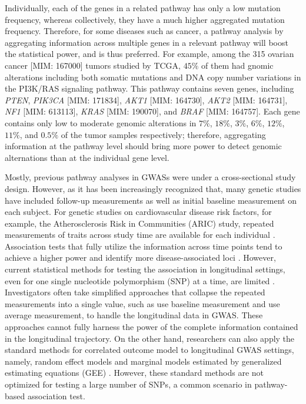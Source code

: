 \documentclass[12pt]{article}
\begin{document}
Individually, each of the genes in a related pathway has only a low mutation frequency, whereas collectively, they have a much higher aggregated mutation frequency. Therefore, for some diseases such as cancer, a pathway analysis by aggregating information across multiple genes in a relevant pathway will boost the statistical power, and is thus preferred. For example, among the 315 ovarian cancer [MIM: 167000] tumors studied by TCGA, $45\%$ of them had gnomic alterations including both somatic mutations and DNA copy number variations in the PI3K/RAS signaling pathway. This pathway contains seven genes, including \textit{PTEN}, \textit{PIK3CA} [MIM: 171834], \textit{AKT1} [MIM: 164730], \textit{AKT2} [MIM: 164731], \textit{NF1} [MIM: 613113], \textit{KRAS} [MIM: 190070], and \textit{BRAF} [MIM: 164757]. Each gene contains only low to moderate genomic alterations in $7\%$, $18\%$, $3\%$, $6\%$, $12\%$, $11\%$, and $0.5\%$ of the tumor samples respectively; therefore, aggregating information at the pathway level should bring more power to detect genomic alternations than at the individual gene level.

Mostly, previous pathway analyses in GWASs were under a cross-sectional study design. However, as it has been increasingly recognized that, many genetic studies have included follow-up measurements as well as initial baseline measurement on each subject. For genetic studies on cardiovascular disease risk factors, for example, the Atherosclerosis Risk in Communities (ARIC) study, repeated measurements of traits across study time are available for each individual \cite{Heiss1989}. Association tests that fully utilize the information across time points tend to achieve a higher power and identify more disease-associated loci \cite{Furlotte2012,Xu2014}. However, current statistical methods for testing the association in longitudinal settings, even for one single nucleotide polymorphism (SNP) at a time, are limited \cite{Fan2012,Furlotte2012}. Investigators often take simplified approaches that collapse the repeated measurements into a single value, such as use baseline measurement and use average measurement, to handle the longitudinal data in GWAS. These approaches cannot fully harness the power of the complete information contained in the longitudinal trajectory. On the other hand, researchers can also apply the standard methods for correlated outcome model to longitudinal GWAS settings, namely, random effect models \cite{laird1982random} and marginal models estimated by generalized estimating equations (GEE) \cite{liang1986longitudinal,zeger1988models}. However, these standard methods are not optimized for testing a large number of SNPs, a common scenario in pathway-based association test.
\end{document}
